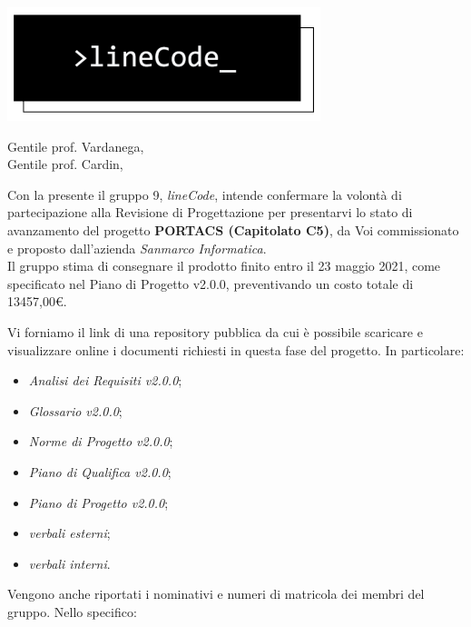 \documentclass[12pt]{letter}
\date{15 marzo 2021}
\begin{document}
\begin{letter}{ }

\includegraphics[scale=0.5]{../../commons/res/lclong.png}

\opening{Gentile prof. Vardanega,\\ Gentile prof. Cardin, }

Con la presente il gruppo 9, \textit{lineCode}, intende confermare la volontà di partecipazione alla Revisione di Progettazione per presentarvi lo stato di avanzamento del progetto
\textbf{PORTACS (Capitolato C5)}, da Voi commissionato e proposto dall'azienda \textit{Sanmarco Informatica}. \\
Il gruppo stima di consegnare il prodotto finito entro il 23 maggio 2021, come specificato nel Piano di Progetto v2.0.0, preventivando un costo totale di 13457,00\euro.


Vi forniamo il link di una repository pubblica da cui è possibile scaricare e visualizzare online i documenti richiesti in questa fase del progetto.
In particolare:

\begin{itemize}
	\item \textit{Analisi dei Requisiti v2.0.0};
	\item \textit{Glossario v2.0.0};
	\item \textit{Norme di Progetto v2.0.0};
	\item \textit{Piano di Qualifica v2.0.0};
	\item \textit{Piano di Progetto v2.0.0};
	\item \textit{verbali esterni};
	\item \textit{verbali interni}.

\end{itemize}

\newpage

Vengono anche riportati i nominativi e numeri di matricola dei membri del gruppo. Nello specifico:


\end{letter}
\end{document}
